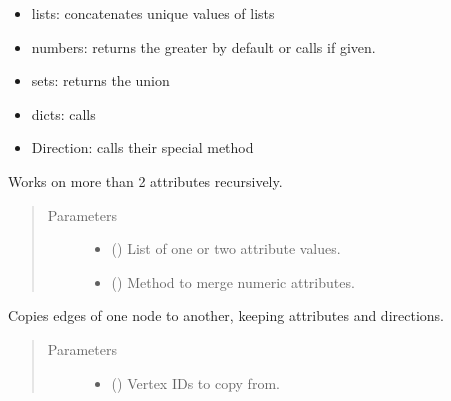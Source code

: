 \documentclass[letterpaper,10pt,english]{sphinxmanual}
\begin{document}
\begin{fulllineitems}
\begin{fulllineitems}
\begin{itemize}
\item {} 
lists: concatenates unique values of lists

\item {} 
numbers: returns the greater by default
or calls  if given.

\item {} 
sets: returns the union

\item {} 
dicts: calls 

\item {} 
Direction: calls their special  method

\end{itemize}

Works on more than 2 attributes recursively.
\begin{quote}\begin{description}
\item[{Parameters}] \leavevmode\begin{itemize}
\item {} 
 () \textendash{} List of one or two attribute values.

\item {} 
 () \textendash{} Method to merge numeric attributes.

\end{itemize}

\end{description}\end{quote}

\end{fulllineitems}


\begin{fulllineitems}
\label{\detokenize{main:pypath.main.PyPath.copy_edges}}
Copies edges of one node to another,
keeping attributes and directions.
\begin{quote}\begin{description}
\item[{Parameters}] \leavevmode\begin{itemize}
\item {} 
 () \textendash{} Vertex IDs to copy from.


\end{itemize}
\end{description}
\end{quote}
\end{fulllineitems}
\end{fulllineitems}
\end{document}
